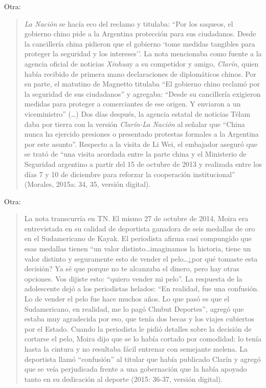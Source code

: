 Otra:

\begin{quote}
\emph{La Nación} se hacía eco del reclamo y titulaba: ``Por los saqueos, el gobierno chino pide a la Argentina protección para sus ciudadanos. Desde la cancillería china pidieron que el gobierno `tome medidas tangibles para proteger la seguridad y los intereses''. La nota mencionaba como fuente a la agencia oficial de noticias \emph{Xinhua}y a su competidor y amigo, \emph{Clarín}, quien había recibido de primera mano declaraciones de diplomáticos chinos. Por su parte, el matutino de Magnetto titulaba ``El gobierno chino reclamó por la seguridad de sus ciudadanos'' y agregaba: ``Desde su cancillería exigieron medidas para proteger a comerciantes de ese origen. Y enviaron a un viceministro'' (\ldots) Dos días después, la agencia estatal de noticias Télam daba por tierra con la versión \emph{Clarín-La Nación} al señalar que ``China nunca ha ejercido presiones o presentado protestas formales a la Argentina por este asunto''. Respecto a la visita de Li Wei, el embajador aseguró que se trató de ``una visita acordada entre la parte china y el Ministerio de Seguridad argentino a partir del 15 de octubre de 2013 y realizada entre los días 7 y 10 de diciembre para reforzar la cooperación institucional'' (Morales, 2015a: 34, 35, versión digital).
\end{quote}

Otra:

\begin{quote}
La nota transcurría en TN. El mismo 27 de octubre de 2014, Moira era entrevistada en su calidad de deportista ganadora de seis medallas de oro en el Sudamericano de Kayak. El periodista afirma casi compungido que esas medallas tienen ``un valor distinto\ldots imaginamos la historia, tiene un valor distinto y seguramente esto de vender el pelo\ldots ¿por qué tomaste esta decisión? Ya sé que porque no te alcanzaba el dinero, pero hay otras opciones. Vos dijiste esto: ``quiero vender mi pelo''. La respuesta de la adolescente dejó a los periodistas helados: ``En realidad, fue una confusión. Lo de vender el pelo fue hace muchos años. Lo que pasó es que el Sudamericano, en realidad, me lo pagó Chubut Deportes'', agregó que estaba muy agradecida por eso, que tenía dos becas y los viajes cubiertos por el Estado. Cuando la periodista le pidió detalles sobre la decisión de cortarse el pelo, Moira dijo que se lo había cortado por comodidad: lo tenía hasta la cintura y no resultaba fácil entrenar con semejante melena. La deportista llamó ``confusión'' al titular que había publicado Clarín y agregó que se veía perjudicada frente a una gobernación que la había apoyado tanto en su dedicación al deporte (2015: 36-37, versión digital).
\end{quote}

